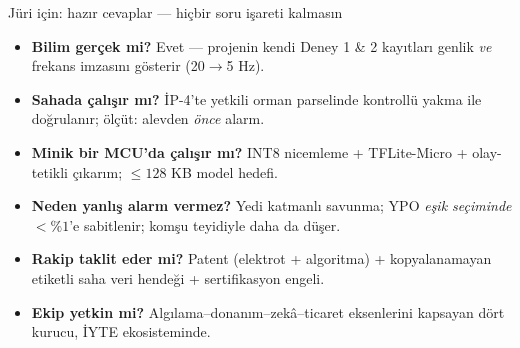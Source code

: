 \documentclass[aspectratio=169,11pt]{beamer}
\newcommand{\soru}[1]{{\color{aegisAI}\bfseries #1}}
\begin{document}
\begin{frame}{Jüri için: hazır cevaplar — hiçbir soru işareti kalmasın}
  \small
  \begin{itemize}
    \item \soru{Bilim gerçek mi?} \; Evet — projenin kendi Deney 1 \& 2 kayıtları
      genlik \emph{ve} frekans imzasını gösterir (20$\to$5 Hz).
    \item \soru{Sahada çalışır mı?} \; İP-4'te yetkili orman parselinde kontrollü
      yakma ile doğrulanır; ölçüt: alevden \emph{önce} alarm.
    \item \soru{Minik bir MCU'da çalışır mı?} \; INT8 nicemleme + TFLite-Micro +
      olay-tetikli çıkarım; $\le 128$ KB model hedefi.
    \item \soru{Neden yanlış alarm vermez?} \; Yedi katmanlı savunma; YPO
      \emph{eşik seçiminde} $<\%1$'e sabitlenir; komşu teyidiyle daha da düşer.
    \item \soru{Rakip taklit eder mi?} \; Patent (elektrot + algoritma) + kopyalanamayan
      etiketli saha veri hendeği + sertifikasyon engeli.
    \item \soru{Ekip yetkin mi?} \; Algılama–donanım–zekâ–ticaret eksenlerini kapsayan
      dört kurucu, İYTE ekosisteminde.
  \end{itemize}
\end{frame}

\appendix
\end{document}
